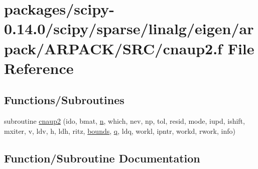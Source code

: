 \hypertarget{cnaup2_8f}{}\section{packages/scipy-\/0.14.0/scipy/sparse/linalg/eigen/arpack/\+A\+R\+P\+A\+C\+K/\+S\+R\+C/cnaup2.f File Reference}
\label{cnaup2_8f}
\subsection*{Functions/\+Subroutines}
\begin{DoxyCompactItemize}
\item 
subroutine \hyperlink{cnaup2_8f_a035cf673a4e7a7f1fbba67310ef1d4e9}{cnaup2} (ido, bmat, \hyperlink{indexexpr_8h_ab427e2e2b4d6cec55fa088ea2a692ace}{n}, which, nev, np, tol, resid, mode, iupd, ishift, mxiter, v, ldv, h, ldh, ritz, \hyperlink{structbounds}{bounds}, \hyperlink{indexexpr_8h_ac886c3584e464b5533390d7440c9dd98}{q}, ldq, workl, ipntr, workd, rwork, info)
\end{DoxyCompactItemize}


\subsection{Function/\+Subroutine Documentation}
\hypertarget{cnaup2_8f_a035cf673a4e7a7f1fbba67310ef1d4e9}{}
